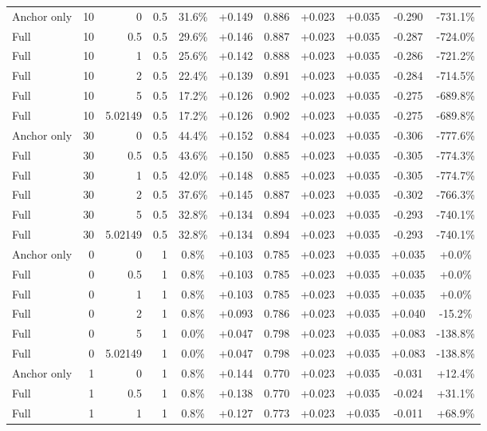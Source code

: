 \begin{table}[htbp]
\begin{tabular}{lrrrccccccc}
Anchor only & 10 & 0 & 0.5 & 31.6\% & +0.149 & 0.886 & +0.023 & +0.035 & -0.290 & -731.1\% \\
Full & 10 & 0.5 & 0.5 & 29.6\% & +0.146 & 0.887 & +0.023 & +0.035 & -0.287 & -724.0\% \\
Full & 10 & 1 & 0.5 & 25.6\% & +0.142 & 0.888 & +0.023 & +0.035 & -0.286 & -721.2\% \\
Full & 10 & 2 & 0.5 & 22.4\% & +0.139 & 0.891 & +0.023 & +0.035 & -0.284 & -714.5\% \\
Full & 10 & 5 & 0.5 & 17.2\% & +0.126 & 0.902 & +0.023 & +0.035 & -0.275 & -689.8\% \\
Full & 10 & 5.02149 & 0.5 & 17.2\% & +0.126 & 0.902 & +0.023 & +0.035 & -0.275 & -689.8\% \\
Anchor only & 30 & 0 & 0.5 & 44.4\% & +0.152 & 0.884 & +0.023 & +0.035 & -0.306 & -777.6\% \\
Full & 30 & 0.5 & 0.5 & 43.6\% & +0.150 & 0.885 & +0.023 & +0.035 & -0.305 & -774.3\% \\
Full & 30 & 1 & 0.5 & 42.0\% & +0.148 & 0.885 & +0.023 & +0.035 & -0.305 & -774.7\% \\
Full & 30 & 2 & 0.5 & 37.6\% & +0.145 & 0.887 & +0.023 & +0.035 & -0.302 & -766.3\% \\
Full & 30 & 5 & 0.5 & 32.8\% & +0.134 & 0.894 & +0.023 & +0.035 & -0.293 & -740.1\% \\
Full & 30 & 5.02149 & 0.5 & 32.8\% & +0.134 & 0.894 & +0.023 & +0.035 & -0.293 & -740.1\% \\
Anchor only & 0 & 0 & 1 & 0.8\% & +0.103 & 0.785 & +0.023 & +0.035 & +0.035 & +0.0\% \\
Full & 0 & 0.5 & 1 & 0.8\% & +0.103 & 0.785 & +0.023 & +0.035 & +0.035 & +0.0\% \\
Full & 0 & 1 & 1 & 0.8\% & +0.103 & 0.785 & +0.023 & +0.035 & +0.035 & +0.0\% \\
Full & 0 & 2 & 1 & 0.8\% & +0.093 & 0.786 & +0.023 & +0.035 & +0.040 & -15.2\% \\
Full & 0 & 5 & 1 & 0.0\% & +0.047 & 0.798 & +0.023 & +0.035 & +0.083 & -138.8\% \\
Full & 0 & 5.02149 & 1 & 0.0\% & +0.047 & 0.798 & +0.023 & +0.035 & +0.083 & -138.8\% \\
Anchor only & 1 & 0 & 1 & 0.8\% & +0.144 & 0.770 & +0.023 & +0.035 & -0.031 & +12.4\% \\
Full & 1 & 0.5 & 1 & 0.8\% & +0.138 & 0.770 & +0.023 & +0.035 & -0.024 & +31.1\% \\
Full & 1 & 1 & 1 & 0.8\% & +0.127 & 0.773 & +0.023 & +0.035 & -0.011 & +68.9\% \\

\end{tabular}
\end{table}
